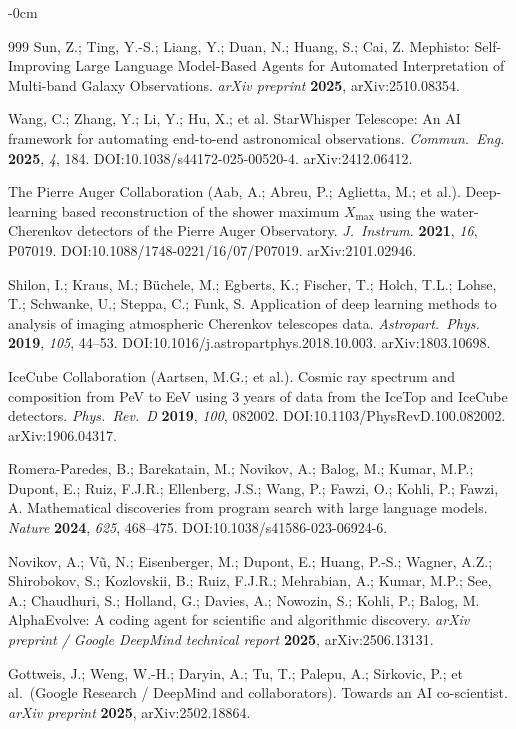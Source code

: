 \documentclass[universe,article,submit,pdftex,oneauthor]{Definitions/mdpi}
\begin{document}
\begin{adjustwidth}{-\extralength}{0cm}
\begin{thebibliography}{999}
Sun, Z.; Ting, Y.-S.; Liang, Y.; Duan, N.; Huang, S.; Cai, Z. Mephisto: Self-Improving Large Language Model-Based Agents for Automated Interpretation of Multi-band Galaxy Observations. \textit{arXiv preprint} \textbf{2025}, arXiv:2510.08354.

Wang, C.; Zhang, Y.; Li, Y.; Hu, X.; et al. StarWhisper Telescope: An AI framework for automating end-to-end astronomical observations. \textit{Commun.\ Eng.} \textbf{2025}, \textit{4}, 184. DOI:10.1038/s44172-025-00520-4. arXiv:2412.06412.

The Pierre Auger Collaboration (Aab, A.; Abreu, P.; Aglietta, M.; et al.). Deep-learning based reconstruction of the shower maximum $X_\mathrm{max}$ using the water-Cherenkov detectors of the Pierre Auger Observatory. \textit{J.\ Instrum.} \textbf{2021}, \textit{16}, P07019. DOI:10.1088/1748-0221/16/07/P07019. arXiv:2101.02946.

Shilon, I.; Kraus, M.; B\"uchele, M.; Egberts, K.; Fischer, T.; Holch, T.L.; Lohse, T.; Schwanke, U.; Steppa, C.; Funk, S. Application of deep learning methods to analysis of imaging atmospheric Cherenkov telescopes data. \textit{Astropart.\ Phys.} \textbf{2019}, \textit{105}, 44--53. DOI:10.1016/j.astropartphys.2018.10.003. arXiv:1803.10698.

IceCube Collaboration (Aartsen, M.G.; et al.). Cosmic ray spectrum and composition from PeV to EeV using 3 years of data from the IceTop and IceCube detectors. \textit{Phys.\ Rev.\ D} \textbf{2019}, \textit{100}, 082002. DOI:10.1103/PhysRevD.100.082002. arXiv:1906.04317.

Romera-Paredes, B.; Barekatain, M.; Novikov, A.; Balog, M.; Kumar, M.P.; Dupont, E.; Ruiz, F.J.R.; Ellenberg, J.S.; Wang, P.; Fawzi, O.; Kohli, P.; Fawzi, A. Mathematical discoveries from program search with large language models. \textit{Nature} \textbf{2024}, \textit{625}, 468--475. DOI:10.1038/s41586-023-06924-6.

Novikov, A.; V\~u, N.; Eisenberger, M.; Dupont, E.; Huang, P.-S.; Wagner, A.Z.; Shirobokov, S.; Kozlovskii, B.; Ruiz, F.J.R.; Mehrabian, A.; Kumar, M.P.; See, A.; Chaudhuri, S.; Holland, G.; Davies, A.; Nowozin, S.; Kohli, P.; Balog, M. AlphaEvolve: A coding agent for scientific and algorithmic discovery. \textit{arXiv preprint / Google DeepMind technical report} \textbf{2025}, arXiv:2506.13131.

Gottweis, J.; Weng, W.-H.; Daryin, A.; Tu, T.; Palepu, A.; Sirkovic, P.; et al.\ (Google Research / DeepMind and collaborators). Towards an AI co-scientist. \textit{arXiv preprint} \textbf{2025}, arXiv:2502.18864.


\end{thebibliography}
\end{adjustwidth}
\end{document}
